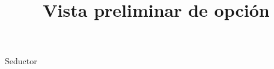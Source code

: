 \documentclass[a4paper,10pt]{article}\usepackage[utf8]{inputenc}\usepackage[spanish]{babel}\usepackage{times}
\title{Vista preliminar de opción}
\begin{document}
\twocolumn 

\maketitle

Seductor
\end{document}
